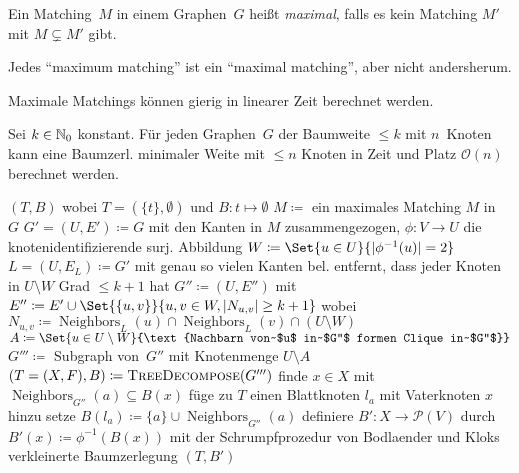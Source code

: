 \documentclass{cheat-sheet}
\newcommand{\size}[1]{\abs{#1}} %
\newcommand{\Powerset}{\mathcal{P}} %
\renewcommand{\O}{\mathcal{O}} %
\DeclareMathOperator{\Neighbors}{Neighbors} %
\newcommand{\IndentState}[1]{\State \quad #1}
\newcommand{\Youtube}[1]{\href{https://www.youtube.com/watch?v=#1}{\textcolor{YoutubeColor}{$\blacktriangleright$}}}
\begin{document}
\begin{defn}
  Ein Matching~$M$ in einem Graphen~$G$ heißt \emph{maximal}, falls es kein Matching $M'$ mit $M \subsetneq M'$ gibt.
\end{defn}

\begin{acht}[\Youtube{03PUwWef2Dg}, \Youtube{bOJC93XxoFc}]
  Jedes ``maximum matching'' ist ein ``maximal matching'', aber nicht andersherum.
\end{acht}

\begin{bem}[\Youtube{jtgBCGVux-8}]
  Maximale Matchings können gierig in linearer Zeit berechnet werden.
\end{bem}

\begin{satz}
  Sei $k \in \mathbb{N}_0$ konstant.
  Für jeden Graphen~$G$ der Baumweite $\leq k$ mit $n$~Knoten kann eine Baumzerl. minimaler Weite mit $\leq n$ Knoten in Zeit und Platz $\O(n)$ berechnet werden.
\end{satz}

\begin{algorithmic}
     \Return $(T, B)$ wobei $T = (\{ t \}, \emptyset)$ und $B : t \mapsto \emptyset$ \EndIf
    \State $M \coloneqq $ ein maximales Matching $M$ in~$G$
    \State $G' = (U, E') \coloneqq G$ mit den Kanten in $M$ zusammengezogen,
    \IndentState $\phi : V \to U$ die knotenidentifizierende surj. Abbildung
    \State $W \coloneqq \Set{u \in U}{\size{\phi^{-1}(u)} = 2}$
    \State $L = (U, E_L) \coloneqq G'$ mit genau so vielen Kanten bel. entfernt,
    \IndentState dass jeder Knoten in $U \setminus W$ Grad $\leq k + 1$ hat
    \State $G'' \coloneqq (U, E'')$ mit $E'' \coloneqq E' \cup \Set{\{ u, v \}}{u, v \in W, \size{N_{u,v}} \geq k+1}$
    \IndentState wobei $N_{u,v} \coloneqq \Neighbors_L(u) \cap \Neighbors_L(v) \cap (U \setminus W)$
    \State $A \coloneqq \Set{u \in U \setminus W}{\text{Nachbarn von~$u$ in~$G''$ formen Clique in~$G''$}}$
    \State $G''' \coloneqq$ Subgraph von~$G''$ mit Knotenmenge $U \setminus A$
    \State $(T = (X, F), B) \coloneqq \Call{TreeDecompose}{G'''}$
      \State finde $x \in X$ mit $\Neighbors_{G''}(a) \subseteq B(x)$
      \State füge zu $T$ einen Blattknoten $l_a$ mit Vaterknoten $x$ hinzu
      \State setze $B(l_a) \coloneqq \{ a \} \cup \Neighbors_{G''}(a)$
    \EndFor
    \State definiere $B' : X \to \Powerset(V)$ durch $B'(x) \coloneqq \phi^{-1}(B(x))$
    \State \Return mit der Schrumpfprozedur von Bodlaender und Kloks
    \IndentState verkleinerte Baumzerlegung $(T, B')$
  \EndFunction
\end{algorithmic}
\end{document}

